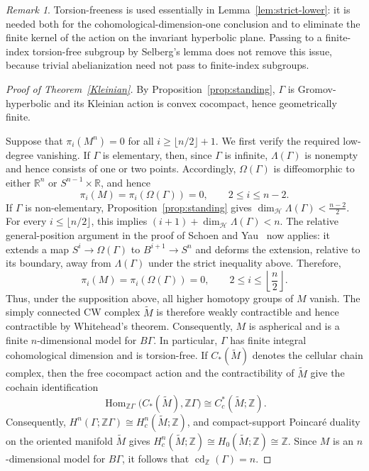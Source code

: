 \documentclass[12pt,oneside,a4paper]{article}
\theoremstyle{mytheorem}
\theoremstyle{remark}
\newtheorem{remark}[definition]{Remark}
\theoremstyle{definition}
\begin{document}
\begin{remark}\label{rem:torsion-caveat}
Torsion-freeness is used essentially in Lemma~\ref{lem:strict-lower}: it is
needed both for the cohomological-dimension-one conclusion and to eliminate
the finite kernel of the action on the invariant hyperbolic plane. Passing to
a finite-index torsion-free subgroup by Selberg's lemma does not remove this
issue, because trivial abelianization need not pass to finite-index subgroups.
\end{remark}






\begin{proof}[Proof of Theorem~\ref{Kleinian}]
By Proposition~\ref{prop:standing}, $\Gamma$ is Gromov-hyperbolic and its
Kleinian action is convex cocompact, hence geometrically finite.

Suppose that $\pi_i(M^n)=0$ for all
$i\geq\lfloor n/2\rfloor+1$. We first verify the required low-degree
vanishing. If $\Gamma$ is elementary, then, since $\Gamma$ is infinite,
$\Lambda(\Gamma)$ is nonempty and hence consists of one or two points.
Accordingly, $\Omega(\Gamma)$ is diffeomorphic to either
$\mathbb R^n$ or $S^{n-1}\times\mathbb R$, and hence
\[
\pi_i(M)=\pi_i(\Omega(\Gamma))=0,
\qquad 2\leq i\leq n-2.
\]
If $\Gamma$ is non-elementary, Proposition~\ref{prop:standing} gives
$\dim_{\mathcal H}\Lambda(\Gamma)<\frac{n-2}{2}$.
For every $i\leq\lfloor n/2\rfloor$, this implies
$(i+1)+\dim_{\mathcal H}\Lambda(\Gamma)<n$.
The relative general-position argument in the proof of Schoen and
Yau~\cite[Theorem~4.6(ii)]{zbMATH04075988} now applies: it extends a map
$S^i\to\Omega(\Gamma)$ to $B^{i+1}\to S^n$ and deforms the extension,
relative to its boundary, away from $\Lambda(\Gamma)$ under the strict
inequality above. Therefore,
\[
\pi_i(M)=\pi_i(\Omega(\Gamma))=0,
\qquad 2\leq i\leq\left\lfloor\frac n2\right\rfloor.
\]
Thus, under the supposition above, all higher homotopy groups of $M$ vanish.
The simply connected CW complex $\widetilde M$ is therefore weakly
contractible and hence contractible by Whitehead's theorem. Consequently,
$M$ is aspherical and is a finite $n$-dimensional model for $B\Gamma$.
In particular, $\Gamma$ has finite integral cohomological dimension and is
torsion-free. If $C_*(\widetilde M)$ denotes the cellular chain complex, then
the free cocompact action and the contractibility of $\widetilde M$ give the
cochain identification
\[
\operatorname{Hom}_{\mathbb Z\Gamma}
 \bigl(C_*(\widetilde M),\mathbb Z\Gamma\bigr)
\cong C_c^*(\widetilde M;\mathbb Z).
\]
Consequently,
$H^n(\Gamma;\mathbb Z\Gamma)\cong H_c^n(\widetilde M;\mathbb Z)$,
and compact-support Poincar\'e duality on the oriented manifold
$\widetilde M$ gives
$H_c^n(\widetilde M;\mathbb Z)\cong H_0(\widetilde M;\mathbb Z)\cong\mathbb Z$.
Since $M$ is an $n$-dimensional model for $B\Gamma$, it follows that
$\operatorname{cd}_{\mathbb Z}(\Gamma)=n$.


\end{proof}
\end{document}
